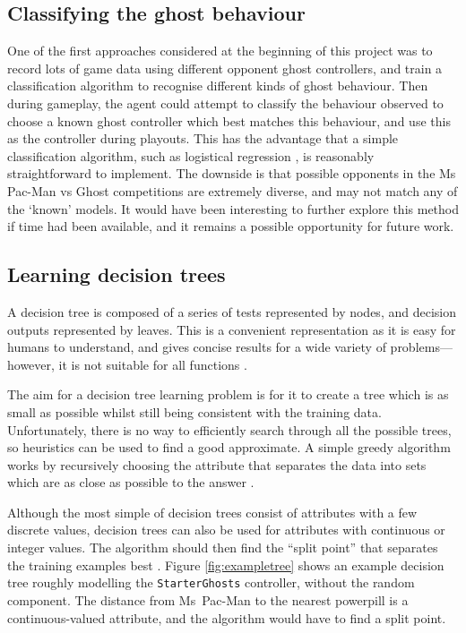 \subsection{Classifying the ghost behaviour}

One of the first approaches considered at the beginning of this project was to record lots of game data using different opponent ghost controllers, and train a classification algorithm to recognise different kinds of ghost behaviour.  Then during gameplay, the agent could attempt to classify the behaviour observed to choose a known ghost controller which best matches this behaviour, and use this as the controller during playouts.  This has the advantage that a simple classification algorithm, such as logistical regression \citep[p. 725]{RussellNorvig}, is reasonably straightforward to implement.  The downside is that possible opponents in the Ms Pac-Man vs Ghost competitions are extremely diverse, and may not match any of the `known' models.  It would have been interesting to further explore this method if time had been available, and it remains a possible opportunity for future work.

\subsection{Learning decision trees}

A decision tree is composed of a series of tests represented by nodes, and decision outputs represented by leaves.  This is a convenient representation as it is easy for humans to understand, and gives concise results for a wide variety of problems---however, it is not suitable for all functions \citep[pp. 698--699]{RussellNorvig}.

The aim for a decision tree learning problem is for it to create a tree which is as small as possible whilst still being consistent with the training data.  Unfortunately, there is no way to efficiently search through all the possible trees, so heuristics can be used to find a good approximate.  A simple greedy algorithm works by recursively choosing the attribute that separates the data into sets which are as close as possible to the answer \citep[p. 703]{RussellNorvig}.

Although the most simple of decision trees consist of attributes with a few discrete values, decision trees can also be used for attributes with continuous or integer values.  The algorithm should then find the ``split point'' that separates the training examples best \citep[p. 707]{RussellNorvig}.  Figure \ref{fig:exampletree} shows an example decision tree roughly modelling the {\tt StarterGhosts} controller, without the random component.  The distance from Ms~Pac-Man to the nearest powerpill is a continuous-valued attribute, and the algorithm would have to find a split point.

